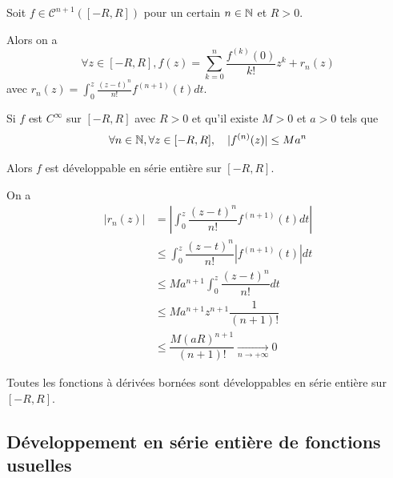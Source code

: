 \documentclass[a4paper,12pt]{article}
\begin{document}
\clearpage

\begin{theoreme}{}{}
    Soit $f \in \mathcal{C}^{n+1}([-R, R])$ pour un certain $n \in \mathbb{N}$ et $R > 0$.

    Alors on a
    $$
    \forall z \in [-R, R], f(z) = \sum_{k = 0}^n \dfrac{f^{(k)}(0)}{k!} z^k + r_n(z)
    $$
    avec $r_n(z) = \int_0^z \frac{(z - t)^n}{n!} f^{(n+1)}(t) dt$.
\end{theoreme}

\begin{proposition}{}{}
    Si $f$ est $C^\infty$ sur $[-R, R]$ avec $R > 0$ et qu'il existe $M > 0$ et $a > 0$ tels que
    $$
    \forall n \in \mathbb{N}, \forall z \in [-R, R], \quad |f^{(n)}(z)| \leq M a^n
    $$

    Alors $f$ est développable en série entière sur $[-R, R]$.
\end{proposition}

\begin{demonstration}
    On a
    \begin{align*}
        |r_n(z)| &= \left| \int_0^z \dfrac{(z - t)^n}{n!} f^{(n+1)}(t) dt \right| \\
        &\leq \int_0^z \dfrac{(z - t)^n}{n!} |f^{(n+1)}(t)| dt \\
        &\leq M a^{n+1} \int_0^z \dfrac{(z - t)^n}{n!} dt \\
        &\leq M a^{n+1} z^{n+1} \dfrac{1}{(n+1)!} \\
        &\leq \dfrac{M (a R)^{n+1}}{(n+1)!} \underset{n \to +\infty}{\longrightarrow} 0
    \end{align*}
\end{demonstration}

\begin{remarque}
    Toutes les fonctions à dérivées bornées sont développables en série entière sur $[-R, R]$.
\end{remarque}

\subsection{Développement en série entière de fonctions usuelles}
\end{document}
